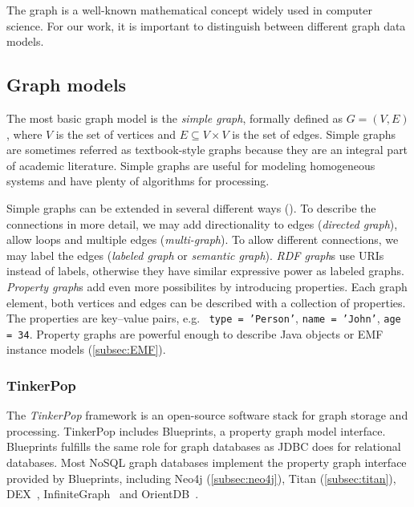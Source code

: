 The graph is a well-known mathematical concept widely used in computer science. For our work, it is important to distinguish between different graph data models.


\subsection{Graph models}

The most basic graph model is the \emph{simple graph}, formally defined as $G = (V, E)$, where $V$ is the set of vertices and $E \subseteq V \times V$ is the set of edges. Simple graphs are sometimes referred as textbook-style graphs because they are an integral part of academic literature. Simple graphs are useful for modeling homogeneous systems and have plenty of algorithms for processing.

Simple graphs can be extended in several different ways (). To describe the connections in more detail, we may add directionality to edges (\emph{directed graph}), allow loops and multiple edges (\emph{multi-graph}). To allow different connections, we may label the edges (\emph{labeled graph} or \emph{semantic graph}). \emph{RDF graph}s use URIs instead of labels, otherwise they have similar expressive power as labeled graphs. \emph{Property graph}s add even more possibilites by introducing properties. Each graph element, both vertices and edges can be described with a collection of properties. The properties are key--value pairs, e.g.\ %
\texttt{type = 'Person'}, \texttt{name = 'John'}, \texttt{age = 34}. 
Property graphs are powerful enough to describe Java objects or EMF instance models (\autoref{subsec:EMF}).

\subsubsection{TinkerPop}

The \textit{TinkerPop} framework is an open-source software stack for graph storage and processing. TinkerPop includes Blueprints, a property graph model interface. Blueprints fulfills the same role for graph databases as JDBC does for relational databases. Most NoSQL graph databases implement the property graph interface provided by Blueprints, including Neo4j (\autoref{subsec:neo4j}), Titan (\autoref{subsec:titan}), DEX~\cite{DEX}, InfiniteGraph~\cite{InfiniteGraph} and OrientDB~\cite{OrientDB}.

